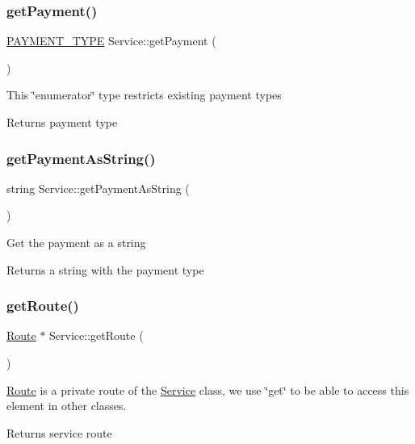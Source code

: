 \subsubsection{\texorpdfstring{get\+Payment()}{getPayment()}}
{\footnotesize\ttfamily \hyperlink{Service_8h_a484d0c1796736fcbe8a3a730617b663f}{P\+A\+Y\+M\+E\+N\+T\+\_\+\+T\+Y\+PE} Service\+::get\+Payment (\begin{DoxyParamCaption}{ }\end{DoxyParamCaption})}

This \char`\"{}enumerator\char`\"{} type restricts existing payment types \begin{DoxyReturn}{Returns}
payment type 
\end{DoxyReturn}
\hypertarget{classService_a029d5a0362c6bca5cd6c8dd1c49f9f44}{}\label{classService_a029d5a0362c6bca5cd6c8dd1c49f9f44} 
\subsubsection{\texorpdfstring{get\+Payment\+As\+String()}{getPaymentAsString()}}
{\footnotesize\ttfamily string Service\+::get\+Payment\+As\+String (\begin{DoxyParamCaption}{ }\end{DoxyParamCaption})}

Get the payment as a string \begin{DoxyReturn}{Returns}
a string with the payment type 
\end{DoxyReturn}
\hypertarget{classService_a5c8aedeb788fac846e5862f7c4af9853}{}\label{classService_a5c8aedeb788fac846e5862f7c4af9853} 
\subsubsection{\texorpdfstring{get\+Route()}{getRoute()}}
{\footnotesize\ttfamily \hyperlink{classRoute}{Route} $\ast$ Service\+::get\+Route (\begin{DoxyParamCaption}{ }\end{DoxyParamCaption})}

\hyperlink{classRoute}{Route} is a private route of the \hyperlink{classService}{Service} class, we use \char`\"{}get\char`\"{} to be able to access this element in other classes. \begin{DoxyReturn}{Returns}
service route 
\end{DoxyReturn}
\hypertarget{classService_a10995791b3188543e2f96c820717a17c}{}\label{classService_a10995791b3188543e2f96c820717a17c} 
